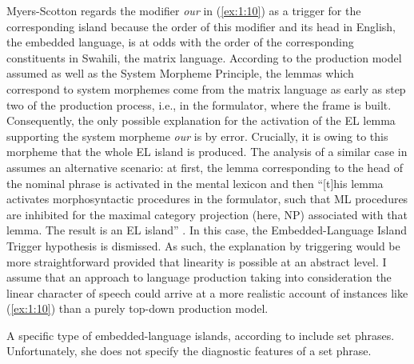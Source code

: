 \noindent Myers-Scotton regards the modifier \textit{our} in (\ref{ex:1:10}) as a trigger for the corresponding island because the order of this modifier and its head in English, the embedded language, is at odds with the order of the corresponding constituents in Swahili, the matrix language. According to the production model assumed as well as the System Morpheme Principle, the lemmas which correspond to system morphemes come from the matrix language as early as step two of the production process, i.e., in the formulator, where the frame is built. Consequently, the only possible explanation for the activation of the EL lemma supporting the system morpheme \textit{our} is by error. Crucially, it is owing to this morpheme that the whole EL island is produced. The analysis of a similar case in \citet{myers-scotton-matching-1995} assumes an alternative scenario: at first, the lemma corresponding to the head of the nominal phrase is activated in the mental lexicon and then ``[t]his lemma activates morphosyntactic procedures in the formulator, such that ML procedures are inhibited for the maximal category projection (here, NP) associated with that lemma. The result is an EL island''  \citep[][995]{myers-scotton-matching-1995}. In this case, the Embedded-Language Island Trigger hypothesis is dismissed. As such, the explanation by triggering would be more straightforward provided that linearity is possible at an abstract level. I assume that an approach to language production taking into consideration the linear character of speech could arrive at a more realistic account of instances like (\ref{ex:1:10}) than a purely top-down production model.

A specific type of embedded-language islands, according to \citet[142, 144]{myers-scotton-duelling-1993} include set phrases. Unfortunately, she does not specify the diagnostic features of a set phrase.

